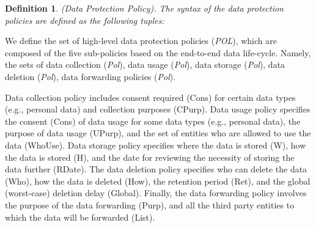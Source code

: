 \documentclass[a4paper]{article}
\newtheorem{ttd}{Definition}
\begin{document}
\begin{ttd}
(Data Protection Policy). The syntax of the data protection policies are defined as the following tuples:   

\begin{figure}[htbp]
\centering
{}
\label{fig:dcpol}
\end{figure}
\end{ttd}

We define the set of high-level data protection policies (\textit{POL}), which are composed of the five sub-policies based on the end-to-end data life-cycle. Namely, the sets of data collection (\textit{Pol}), data usage  (\textit{Pol}), data storage (\textit{Pol}), data deletion (\textit{Pol}), data forwarding policies (\textit{Pol}). 

Data collection policy includes consent required (Cons) for certain data types (e.g., personal data) and collection purposes (CPurp). Data usage policy specifies the  consent (Cons) of data usage for some data types (e.g., personal data), the purpose of data usage (UPurp), and the set of entities who are allowed to use the data (WhoUse). Data storage policy specifies where the data is stored (W), how the data is stored (H), and the date for reviewing the necessity of storing the data further (RDate). The data deletion policy specifies who can delete the data (Who), how the data is deleted (How), the retention period (Ret), and the global (worst-case) deletion delay (Global). Finally, the data forwarding policy involves the purpose of the data forwarding (Purp), and all the third party entities to which the data will be forwarded (List).   
\end{document}
